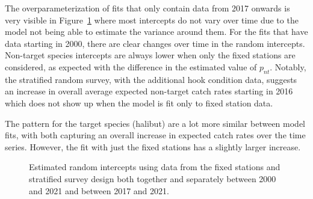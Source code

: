 \documentclass[12pt]{article}\usepackage[]{graphicx}\usepackage[]{color}
\begin{document}
The overparameterization of fits that only contain data from 2017 onwards is very visible in Figure~\ref{fig:rand-int} where most intercepts do not vary over time due to the model not being able to estimate the variance around them. For the fits that have data starting in 2000, there are clear changes over time in the random intercepts. Non-target species intercepts are always lower when only the fixed stations are considered, as expected with the difference in the estimated value of \(p_{nt}\). Notably, the stratified random survey, with the additional hook condition data, suggests an increase in overall average expected non-target catch rates starting in 2016 which does not show up when the model is fit only to fixed station data.

The pattern for the target species (halibut) are a lot more similar between model fits, with both capturing an overall increase in expected catch rates over the time series. However, the fit with just the fixed stations has a slightly larger increase.
\begin{figure}[htb]

{\centering {}  

}

\caption{Estimated random intercepts using data from the fixed stations and stratified survey design both together and separately between 2000 and 2021 and between 2017 and 2021.}\label{fig:rand-int}
\end{figure}
\end{document}
